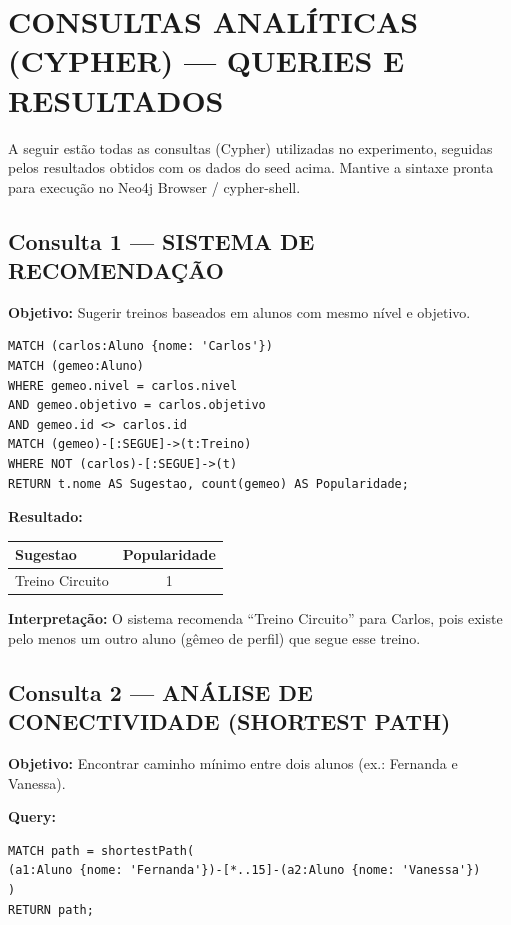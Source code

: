 \documentclass[12pt,a4paper]{article}
\begin{document}
\section{CONSULTAS ANALÍTICAS (CYPHER) — QUERIES E RESULTADOS}

A seguir estão todas as consultas (Cypher) utilizadas no experimento, seguidas pelos resultados obtidos com os dados do seed acima. Mantive a sintaxe pronta para execução no Neo4j Browser / cypher-shell.

\subsection{Consulta 1 — SISTEMA DE RECOMENDAÇÃO}

\textbf{Objetivo:} Sugerir treinos baseados em alunos com mesmo nível e objetivo.

\lstset{caption=Consulta 1 - Sistema de Recomendação}
\begin{lstlisting}
MATCH (carlos:Aluno {nome: 'Carlos'})
MATCH (gemeo:Aluno)
WHERE gemeo.nivel = carlos.nivel
AND gemeo.objetivo = carlos.objetivo
AND gemeo.id <> carlos.id
MATCH (gemeo)-[:SEGUE]->(t:Treino)
WHERE NOT (carlos)-[:SEGUE]->(t)
RETURN t.nome AS Sugestao, count(gemeo) AS Popularidade;
\end{lstlisting}

\textbf{Resultado:}
\begin{table}[h]
\centering
\begin{tabular}{lc}
\toprule
Sugestao & Popularidade \\
\midrule
Treino Circuito & 1 \\
\bottomrule
\end{tabular}
\end{table}

\textbf{Interpretação:} O sistema recomenda ``Treino Circuito'' para Carlos, pois existe pelo menos um outro aluno (gêmeo de perfil) que segue esse treino.

\subsection{Consulta 2 — ANÁLISE DE CONECTIVIDADE (SHORTEST PATH)}

\textbf{Objetivo:} Encontrar caminho mínimo entre dois alunos (ex.: Fernanda e Vanessa).

\textbf{Query:}
\lstset{caption=Consulta 2 - Shortest Path}
\begin{lstlisting}
MATCH path = shortestPath(
(a1:Aluno {nome: 'Fernanda'})-[*..15]-(a2:Aluno {nome: 'Vanessa'})
)
RETURN path;
\end{lstlisting}
\end{document}
